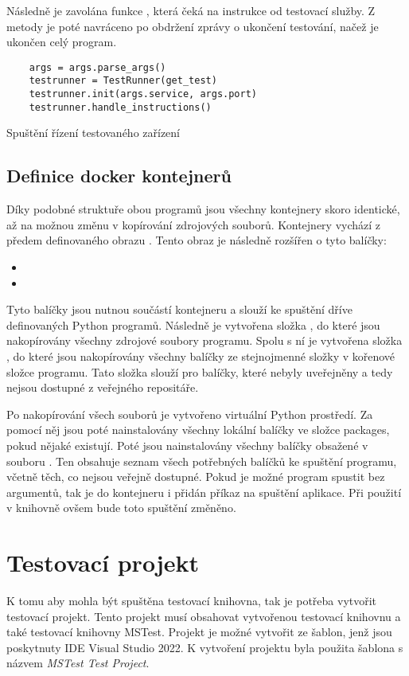 Následně je zavolána funkce , která čeká na instrukce od testovací služby. Z metody je poté navráceno po obdržení zprávy o ukončení testování, načež je ukončen celý program. 


\begin{listing}[htbp]
    \centering
    \begin{verbatim}
    args = args.parse_args()
    testrunner = TestRunner(get_test)
    testrunner.init(args.service, args.port)
    testrunner.handle_instructions()
    \end{verbatim}
\caption{Spuštění řízení testovaného zařízení}
\label{listing:server_main}
\end{listing}


\subsection{Definice docker kontejnerů}

Díky podobné struktuře obou programů jsou všechny kontejnery skoro identické, až na možnou změnu v kopírování zdrojových souborů. Kontejnery vychází z předem definovaného obrazu . Tento obraz je následně rozšířen o tyto balíčky:

\begin{itemize}
    \item {}
    \item {}
\end{itemize}

Tyto balíčky jsou nutnou součástí kontejneru a slouží ke spuštění dříve definovaných Python programů. Následně je vytvořena složka , do které jsou nakopírovány všechny zdrojové soubory programu. Spolu s ní je vytvořena složka , do které jsou nakopírovány všechny balíčky ze stejnojmenné složky v kořenové složce programu. Tato složka slouží pro balíčky, které nebyly uveřejněny a tedy nejsou dostupné z veřejného repositáře.

Po nakopírování všech souborů je vytvořeno virtuální Python prostředí. Za pomocí něj jsou poté nainstalovány všechny lokální balíčky ve složce packages, pokud nějaké existují. Poté jsou nainstalovány všechny balíčky obsažené v souboru . Ten obsahuje seznam všech potřebných balíčků ke spuštění programu, včetně těch, co nejsou veřejně dostupné. Pokud je možné program spustit bez argumentů, tak je do kontejneru i přidán příkaz na spuštění aplikace. Při použití v knihovně ovšem bude toto spuštění změněno. 

\section{Testovací projekt}

K tomu aby mohla být spuštěna testovací knihovna, tak je potřeba vytvořit testovací projekt. Tento projekt musí obsahovat vytvořenou testovací knihovnu a také testovací knihovny MSTest. Projekt je možné vytvořit ze šablon, jenž jsou poskytnuty IDE Visual Studio 2022\cite{vs2022}. K vytvoření projektu byla použita šablona s názvem \textit{MSTest Test Project}. 

